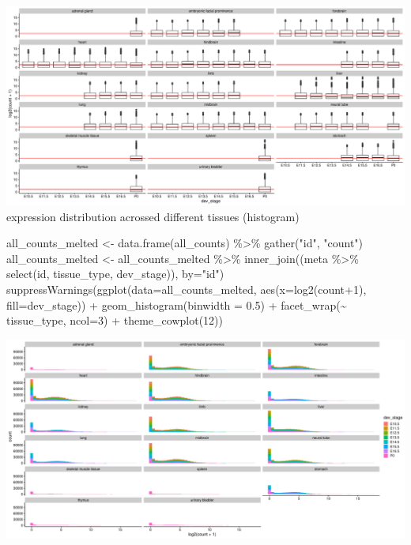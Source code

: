 \documentclass[
]{article}
\newenvironment{Shaded}{\begin{snugshade}}{\end{snugshade}}
\newcommand{\AttributeTok}[1]{\textcolor[rgb]{0.77,0.63,0.00}{#1}}
\newcommand{\DecValTok}[1]{\textcolor[rgb]{0.00,0.00,0.81}{#1}}
\newcommand{\FloatTok}[1]{\textcolor[rgb]{0.00,0.00,0.81}{#1}}
\newcommand{\FunctionTok}[1]{\textcolor[rgb]{0.00,0.00,0.00}{#1}}
\newcommand{\NormalTok}[1]{#1}
\newcommand{\OtherTok}[1]{\textcolor[rgb]{0.56,0.35,0.01}{#1}}
\newcommand{\SpecialCharTok}[1]{\textcolor[rgb]{0.00,0.00,0.00}{#1}}
\newcommand{\StringTok}[1]{\textcolor[rgb]{0.31,0.60,0.02}{#1}}
\begin{document}
\includegraphics{Exploration_files/figure-latex/unnamed-chunk-9-1.pdf}
expression distribution acrossed different tissues (histogram)

\begin{Shaded}
\begin{Highlighting}[]
\NormalTok{all\_counts\_melted }\OtherTok{\textless{}{-}} \FunctionTok{data.frame}\NormalTok{(all\_counts) }\SpecialCharTok{\%\textgreater{}\%} \FunctionTok{gather}\NormalTok{(}\StringTok{"id"}\NormalTok{, }\StringTok{"count"}\NormalTok{)}
\NormalTok{all\_counts\_melted }\OtherTok{\textless{}{-}}\NormalTok{ all\_counts\_melted }\SpecialCharTok{\%\textgreater{}\%} \FunctionTok{inner\_join}\NormalTok{((meta }\SpecialCharTok{\%\textgreater{}\%} \FunctionTok{select}\NormalTok{(id, tissue\_type, dev\_stage)), }\AttributeTok{by=}\StringTok{"id"}\NormalTok{)}
  \FunctionTok{suppressWarnings}\NormalTok{(}\FunctionTok{ggplot}\NormalTok{(}\AttributeTok{data=}\NormalTok{all\_counts\_melted, }\FunctionTok{aes}\NormalTok{(}\AttributeTok{x=}\FunctionTok{log2}\NormalTok{(count}\SpecialCharTok{+}\DecValTok{1}\NormalTok{), }\AttributeTok{fill=}\NormalTok{dev\_stage)) }\SpecialCharTok{+} \FunctionTok{geom\_histogram}\NormalTok{(}\AttributeTok{binwidth =} \FloatTok{0.5}\NormalTok{) }\SpecialCharTok{+}  \FunctionTok{facet\_wrap}\NormalTok{(}\SpecialCharTok{\textasciitilde{}}\NormalTok{ tissue\_type, }\AttributeTok{ncol=}\DecValTok{3}\NormalTok{) }\SpecialCharTok{+} \FunctionTok{theme\_cowplot}\NormalTok{(}\DecValTok{12}\NormalTok{))}
\end{Highlighting}
\end{Shaded}

\includegraphics{Exploration_files/figure-latex/unnamed-chunk-10-1.pdf}
\end{document}
